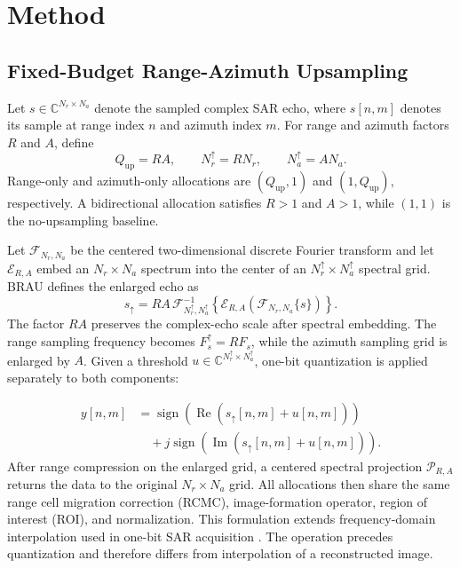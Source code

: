 \documentclass[conference]{IEEEtran}
\begin{document}
\section{Method}

\subsection{Fixed-Budget Range-Azimuth Upsampling}

Let $s\in\mathbb{C}^{N_r\times N_a}$ denote the sampled complex SAR echo, where $s[n,m]$ denotes its sample at range index $n$ and azimuth index $m$. For range and azimuth factors $R$ and $A$, define
\begin{equation}
    Q_{\mathrm{up}}=RA,\qquad
    N_r^{\uparrow}=RN_r,\qquad N_a^{\uparrow}=AN_a.
\end{equation}
Range-only and azimuth-only allocations are $(Q_{\mathrm{up}},1)$ and $(1,Q_{\mathrm{up}})$, respectively. A bidirectional allocation satisfies $R>1$ and $A>1$, while $(1,1)$ is the no-upsampling baseline.

Let $\mathcal{F}_{N_r,N_a}$ be the centered two-dimensional discrete Fourier transform and let $\mathcal{E}_{R,A}$ embed an $N_r\times N_a$ spectrum into the center of an $N_r^{\uparrow}\times N_a^{\uparrow}$ spectral grid. BRAU defines the enlarged echo as
\begin{equation}
    s_{\uparrow}
    =RA\,\mathcal{F}^{-1}_{N_r^{\uparrow},N_a^{\uparrow}}
    \!\left\{\mathcal{E}_{R,A}
    \!\left(\mathcal{F}_{N_r,N_a}\{s\}\right)\right\}.
\end{equation}
The factor $RA$ preserves the complex-echo scale after spectral embedding. The range sampling frequency becomes $F_s^{\uparrow}=RF_s$, while the azimuth sampling grid is enlarged by $A$. Given a threshold $u\in\mathbb{C}^{N_r^{\uparrow}\times N_a^{\uparrow}}$, one-bit quantization is applied separately to both components:

\begin{equation}
    \begin{aligned}
    y[n,m]&=\operatorname{sign}\!\left(\operatorname{Re}
    (s_{\uparrow}[n,m]+u[n,m])\right)\\
    &\quad+j\operatorname{sign}\!\left(\operatorname{Im}
    (s_{\uparrow}[n,m]+u[n,m])\right).
    \end{aligned}
\end{equation}
After range compression on the enlarged grid, a centered spectral projection $\mathcal{P}_{R,A}$ returns the data to the original $N_r\times N_a$ grid. All allocations then share the same range cell migration correction (RCMC), image-formation operator, region of interest (ROI), and normalization. This formulation extends frequency-domain interpolation used in one-bit SAR acquisition \cite{zhao2019onebit}. The operation precedes quantization and therefore differs from interpolation of a reconstructed image.
\end{document}
